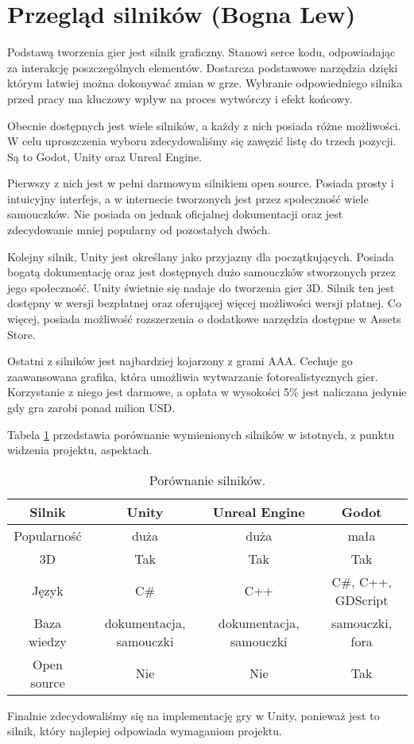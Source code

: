 \section{Przegląd silników (Bogna Lew)}
Podstawą tworzenia gier jest silnik graficzny. Stanowi serce kodu, odpowiadając za interakcję poszczególnych elementów.
Dostarcza podstawowe narzędzia dzięki którym łatwiej można dokonywać zmian w grze. Wybranie odpowiedniego silnika przed
 pracy ma kluczowy wpływ na proces wytwórczy i efekt końcowy.

Obecnie dostępnych jest wiele silników, a każdy z nich posiada różne możliwości. W celu uproszczenia wyboru zdecydowaliśmy
się zawęzić listę do trzech pozycji. Są to Godot, Unity oraz Unreal Engine.

Pierwszy z nich jest w pełni darmowym silnikiem open source. Posiada prosty i intuicyjny interfejs, a w internecie
tworzonych jest przez społeczność wiele samouczków. Nie posiada on jednak oficjalnej dokumentacji oraz jest zdecydowanie
mniej popularny od pozostałych dwóch.

Kolejny silnik, Unity jest określany jako przyjazny dla początkujących. Posiada bogatą dokumentację oraz jest dostępnych
dużo samouczków stworzonych przez jego społeczność. Unity świetnie się nadaje do tworzenia gier 3D. Silnik ten jest
dostępny w wersji bezpłatnej oraz oferującej więcej możliwości wersji płatnej. Co więcej, posiada możliwość rozszerzenia
o dodatkowe narzędzia dostępne w Assets Store.

Ostatni z silników jest najbardziej kojarzony z grami AAA. Cechuje go zaawansowana grafika, która umożliwia wytwarzanie
fotorealistycznych gier. Korzystanie z niego jest darmowe, a opłata w wysokości 5\% jest naliczana jedynie gdy gra
zarobi ponad milion USD.

Tabela \ref{fig:teng} przedstawia porównanie wymienionych silników w istotnych, z punktu widzenia projektu, aspektach.

\begin{table}[h]
\caption{Porównanie silników.}
\begin{center}
\begin{tabular}{ |c||c|c|c| }
 \hline
 Silnik & Unity & Unreal Engine & Godot \\
 \hline \hline
 Popularność & duża & duża & mała \\
 \hline
 3D & Tak & Tak & Tak \\
 \hline
 Język & C\# & C++ & C\#, C++, GDScript \\
 \hline
 Baza wiedzy & dokumentacja, samouczki & dokumentacja, samouczki & samouczki, fora \\
 \hline
 Open source & Nie & Nie & Tak \\
 \hline
\end{tabular}
\end{center}
\label{fig:teng} 
\end{table}

Finalnie zdecydowaliśmy się na implementację gry w Unity, ponieważ jest to silnik, który najlepiej odpowiada wymaganiom projektu.
